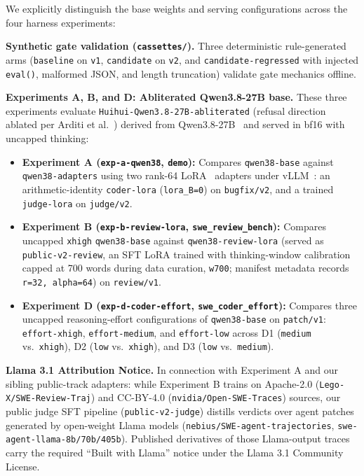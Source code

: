 \documentclass[conference]{IEEEtran}
\begin{document}
We explicitly distinguish the base weights and serving configurations across the four harness experiments:

\textbf{Synthetic gate validation (\texttt{cassettes/}).} Three deterministic rule-generated arms (\texttt{baseline} on \texttt{v1}, \texttt{candidate} on \texttt{v2}, and \texttt{candidate-{}regressed} with injected \texttt{eval()}, malformed JSON, and length truncation) validate gate mechanics offline.

\textbf{Experiments A, B, and D: Abliterated Qwen3.8-27B base.} These three experiments evaluate \texttt{Huihui-Qwen3.8-27B-abliterated} (refusal direction ablated per Arditi et al.~\cite{arditi2024refusal}) derived from Qwen3.8-27B~\cite{qwen38card,qwen3report} and served in bf16 with uncapped thinking:
\begin{itemize}
\item \textbf{Experiment A (\texttt{exp-{}a-{}qwen38}, \texttt{demo}):} Compares \texttt{qwen38-{}base} against \texttt{qwen38-{}adapters} using two rank-64 LoRA~\cite{hu2022lora} adapters under vLLM~\cite{kwon2023vllm}: an arithmetic-identity \texttt{coder-{}lora} (\texttt{lora\_B=0}) on \texttt{bugfix/\allowbreak{}v2}, and a trained \texttt{judge-{}lora} on \texttt{judge/\allowbreak{}v2}.
\item \textbf{Experiment B (\texttt{exp-{}b-{}review-{}lora}, \texttt{swe\_\allowbreak{}review\_\allowbreak{}bench}):} Compares uncapped \texttt{xhigh} \texttt{qwen38-{}base} against \texttt{qwen38-{}review-{}lora} (served as \texttt{public-{}v2-{}review}, an SFT LoRA trained with thinking-window calibration capped at 700 words during data curation, \texttt{w700}; manifest metadata records \texttt{r=32, alpha=64}) on \texttt{review/\allowbreak{}v1}.
\item \textbf{Experiment D (\texttt{exp-{}d-{}coder-{}effort}, \texttt{swe\_\allowbreak{}coder\_\allowbreak{}effort}):} Compares three uncapped reasoning-effort configurations of \texttt{qwen38-{}base} on \texttt{patch/\allowbreak{}v1}: \texttt{effort-{}xhigh}, \texttt{effort-{}medium}, and \texttt{effort-{}low} across D1 (\texttt{medium} vs.\ \texttt{xhigh}), D2 (\texttt{low} vs.\ \texttt{xhigh}), and D3 (\texttt{low} vs.\ \texttt{medium}).
\end{itemize}

\textbf{Llama 3.1 Attribution Notice.} In connection with Experiment A and our sibling public-track adapters: while Experiment B trains on Apache-2.0 (\texttt{Lego-X/SWE-Review-Traj}) and CC-BY-4.0 (\texttt{nvidia/Open-SWE-Traces}) sources, our public judge SFT pipeline (\texttt{public-{}v2-{}judge}) distills verdicts over agent patches generated by open-weight Llama models (\texttt{nebius/SWE-agent-trajectories}, \texttt{swe-agent-llama-8b/70b/405b}). Published derivatives of those Llama-output traces carry the required ``Built with Llama'' notice under the Llama 3.1 Community License.
\end{document}
